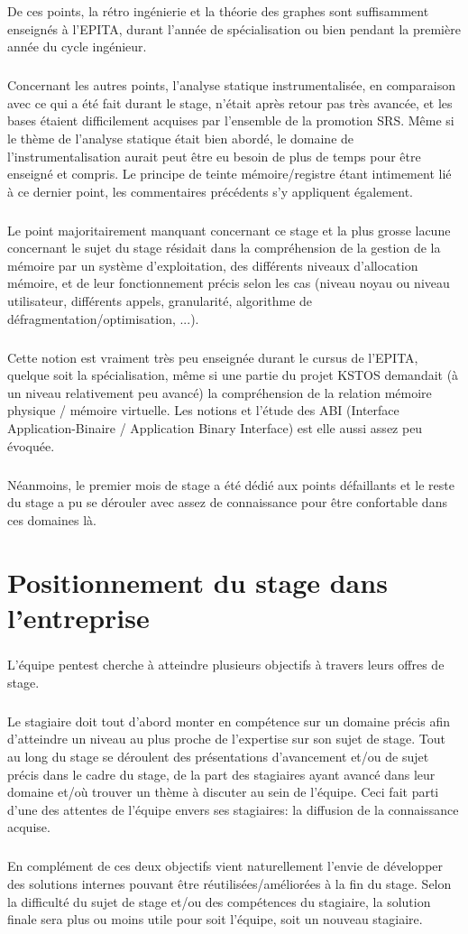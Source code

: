 De ces points, la rétro ingénierie et la théorie des graphes sont suffisamment enseignés à l'EPITA,
durant l'année de spécialisation ou bien pendant la première année du cycle ingénieur.
\subparagraph{}
Concernant les autres points, l'analyse statique instrumentalisée, en comparaison avec ce qui a été
fait durant le stage, n'était après retour pas très avancée, et les bases étaient difficilement acquises par
l'ensemble de la promotion SRS. Même si le thème de l'analyse statique était bien abordé, le domaine de l'instrumentalisation
aurait peut être eu besoin de plus de temps pour être enseigné et compris. Le principe de teinte mémoire/registre étant intimement
lié à ce dernier point, les commentaires précédents s'y appliquent également.
\subparagraph{}
Le point majoritairement manquant concernant ce stage et la plus grosse lacune concernant le sujet du stage résidait dans la compréhension de
la gestion de la mémoire par un système d'exploitation, des différents niveaux d'allocation mémoire, et de leur fonctionnement précis
selon les cas (niveau noyau ou niveau utilisateur, différents appels, granularité, algorithme de défragmentation/optimisation, ...).
\subparagraph{}
Cette notion est vraiment très peu enseignée durant le cursus de l'EPITA, quelque soit la spécialisation, même si une partie du projet KSTOS
demandait (à un niveau relativement peu avancé) la compréhension de la relation mémoire physique / mémoire virtuelle.
Les notions et l'étude des ABI (Interface Application-Binaire / Application Binary Interface) est elle aussi assez peu évoquée.
\subparagraph{}

Néanmoins, le premier mois de stage a été dédié aux points défaillants et le reste du stage a pu se dérouler avec assez de connaissance
pour être confortable dans ces domaines là.

\subparagraph{}


\section*{Positionnement du stage dans l'entreprise}
\paragraph{}
\subparagraph{}
L'équipe pentest cherche à atteindre plusieurs objectifs à travers leurs offres de stage.
\subparagraph{}
Le stagiaire doit tout d'abord monter en compétence sur un domaine précis afin d'atteindre un niveau au plus proche de l'expertise sur son sujet de stage.\newline
Tout au long du stage se déroulent des présentations d'avancement et/ou de sujet précis dans le cadre du stage, de la part des stagiaires ayant avancé dans leur domaine et/où trouver un thème à discuter au sein de l'équipe. Ceci fait parti d'une des attentes de l'équipe envers ses stagiaires: la diffusion de la connaissance acquise.
\subparagraph{}
En complément de ces deux objectifs vient naturellement l'envie de développer des solutions internes pouvant être réutilisées/améliorées à la fin du stage. Selon la difficulté du sujet de stage et/ou des compétences du stagiaire, la solution finale sera plus ou moins utile pour soit l'équipe, soit un nouveau stagiaire.\newline

